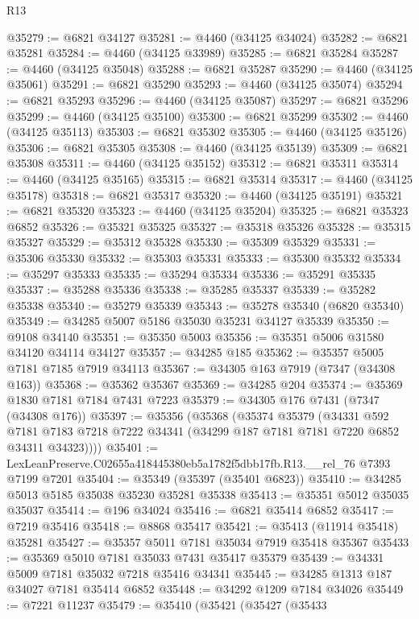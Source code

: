 \begin{lexlean}{R13}
\begin{coremodule}
@35279 := @6821 @34127
@35281 := @4460 (@34125 @34024)
@35282 := @6821 @35281
@35284 := @4460 (@34125 @33989)
@35285 := @6821 @35284
@35287 := @4460 (@34125 @35048)
@35288 := @6821 @35287
@35290 := @4460 (@34125 @35061)
@35291 := @6821 @35290
@35293 := @4460 (@34125 @35074)
@35294 := @6821 @35293
@35296 := @4460 (@34125 @35087)
@35297 := @6821 @35296
@35299 := @4460 (@34125 @35100)
@35300 := @6821 @35299
@35302 := @4460 (@34125 @35113)
@35303 := @6821 @35302
@35305 := @4460 (@34125 @35126)
@35306 := @6821 @35305
@35308 := @4460 (@34125 @35139)
@35309 := @6821 @35308
@35311 := @4460 (@34125 @35152)
@35312 := @6821 @35311
@35314 := @4460 (@34125 @35165)
@35315 := @6821 @35314
@35317 := @4460 (@34125 @35178)
@35318 := @6821 @35317
@35320 := @4460 (@34125 @35191)
@35321 := @6821 @35320
@35323 := @4460 (@34125 @35204)
@35325 := @6821 @35323 @6852
@35326 := @35321 @35325
@35327 := @35318 @35326
@35328 := @35315 @35327
@35329 := @35312 @35328
@35330 := @35309 @35329
@35331 := @35306 @35330
@35332 := @35303 @35331
@35333 := @35300 @35332
@35334 := @35297 @35333
@35335 := @35294 @35334
@35336 := @35291 @35335
@35337 := @35288 @35336
@35338 := @35285 @35337
@35339 := @35282 @35338
@35340 := @35279 @35339
@35343 := @35278 @35340 (@6820 @35340)
@35349 := @34285 @5007 @5186 @35030 @35231 @34127 @35339
@35350 := @9108 @34140
@35351 := @35350 @5003
@35356 := @35351 @5006 @31580 @34120 @34114 @34127
@35357 := @34285 @185
@35362 := @35357 @5005 @7181 @7185 @7919 @34113
@35367 := @34305 @163 @7919 (@7347 (@34308 @163))
@35368 := @35362 @35367
@35369 := @34285 @204
@35374 := @35369 @1830 @7181 @7184 @7431 @7223
@35379 := @34305 @176 @7431 (@7347 (@34308 @176))
@35397 := @35356
    (@35368
      (@35374
        @35379
        (@34331
          @592
          @7181
          @7183
          @7218
          @7222
          @34341
          (@34299 @187 @7181 @7181 @7220 @6852 @34311 @34323))))
@35401 := LexLeanPreserve.C02655a418445380eb5a1782f5dbb17fb.R13.__rel_76 @7393 @7199 @7201
@35404 := @35349 (@35397 (@35401 @6823))
@35410 := @34285 @5013 @5185 @35038 @35230 @35281 @35338
@35413 := @35351 @5012 @35035 @35037
@35414 := @196 @34024
@35416 := @6821 @35414 @6852
@35417 := @7219 @35416
@35418 := @8868 @35417
@35421 := @35413 (@11914 @35418) @35281
@35427 := @35357 @5011 @7181 @35034 @7919 @35418 @35367
@35433 := @35369 @5010 @7181 @35033 @7431 @35417 @35379
@35439 := @34331 @5009 @7181 @35032 @7218 @35416 @34341
@35445 := @34285 @1313 @187 @34027 @7181 @35414 @6852
@35448 := @34292 @1209 @7184 @34026
@35449 := @7221 @11237
@35479 := @35410
    (@35421
      (@35427
        (@35433

\end{coremodule}
\end{lexlean}
